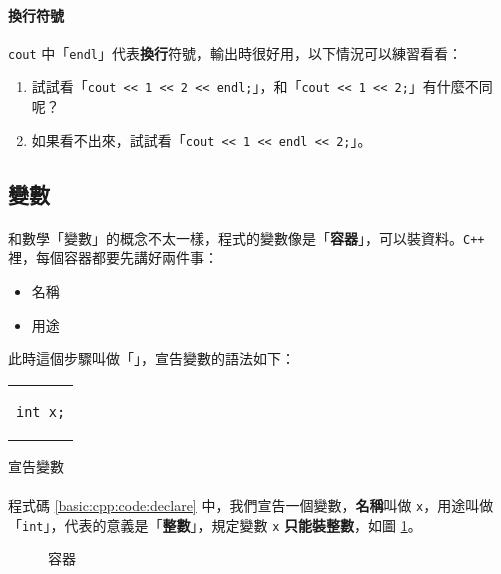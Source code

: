 \documentclass[12pt,a4paper,oneside]{report}
\begin{document}
\begin{CJK}{UTF8}{bkai}
\paragraph{換行符號}\lstinline!cout! 中「\lstinline!endl!」代表\textbf{換行}符號，輸出時很好用，以下情況可以練習看看：
\begin{enumerate}
\item 試試看「\lstinline!cout << 1 << 2 << endl;!」，和「\lstinline!cout << 1 << 2;!」有什麼不同呢？
\item 如果看不出來，試試看「\lstinline!cout << 1 << endl << 2;!」。
\end{enumerate}

\subsection{變數}

\paragraph{}和數學「變數」的概念不太一樣，程式的變數像是「\textbf{容器}」，可以裝資料。\texttt{C++} 裡，每個容器都要先講好兩件事：
\begin{itemize}
\item 名稱
\item 用途
\end{itemize}
此時這個步驟叫做「」，宣告變數的語法如下：

\begin{code}[h!]
\centering
\begin{tabular}{c}
\begin{lstlisting}
int x;
\end{lstlisting}
\end{tabular}
\caption{宣告變數}
\label{basic:cpp:code:declare}
\end{code}

\paragraph{}程式碼 \ref{basic:cpp:code:declare} 中，我們宣告一個變數，\textbf{名稱}叫做 \lstinline!x!，用途叫做「\lstinline!int!」，代表的意義是「\textbf{整數}」，規定變數 \lstinline!x! \textbf{只能裝整數}，如圖 \ref{basic:cpp:fig:variable}。

\begin{figure}[h]
\centering
{}
\caption{容器}
\label{basic:cpp:fig:variable}
\end{figure}


\end{CJK}
\end{document}
